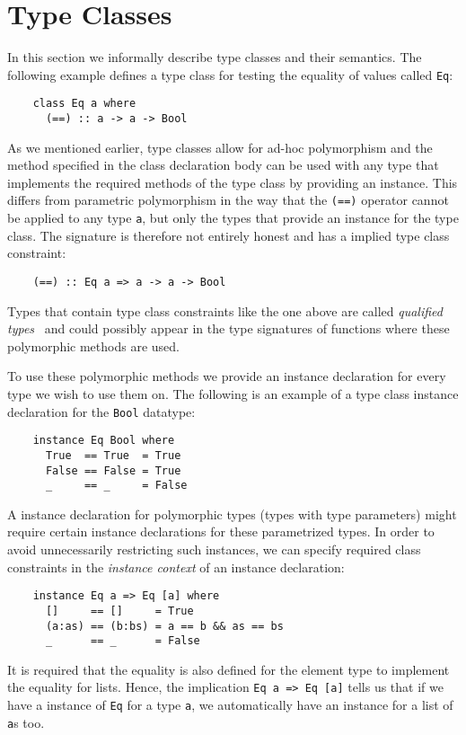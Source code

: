 \section{Type Classes}
In this section we informally describe type classes and their semantics. The
following example defines a type class for testing the equality of values
called \texttt{Eq}:
%
\begin{verbatim}
    class Eq a where
      (==) :: a -> a -> Bool
\end{verbatim}
%
As we mentioned earlier, type classes allow for ad-hoc polymorphism and the method
specified in the class declaration body can be used with any type that
implements the required methods of the type class by providing an instance.
This differs from parametric polymorphism in the way that the \texttt{(==)}
operator cannot be applied to any type \texttt{a}, but only the types that provide an
instance for the type class. The signature is therefore not entirely honest and
has a implied type class constraint:
\begin{verbatim}
    (==) :: Eq a => a -> a -> Bool
\end{verbatim}
Types that contain type class constraints like the one above are called
\textit{qualified types}~\cite{JonesThesis} and could possibly appear in the type signatures of
functions where these polymorphic methods are used.

To use these polymorphic methods we provide an instance declaration for every type
we wish to use them on. The following is an example of a type class instance
declaration for the \texttt{Bool} datatype:
\begin{verbatim}
    instance Eq Bool where
      True  == True  = True
      False == False = True
      _     == _     = False
\end{verbatim}
%
A instance declaration for polymorphic types (types with type parameters) might
require certain instance declarations for these parametrized types. In order to avoid unnecessarily restricting such instances,
we can specify required class constraints in the {\em instance context} of an instance declaration:
\begin{verbatim}
    instance Eq a => Eq [a] where
      []     == []     = True
      (a:as) == (b:bs) = a == b && as == bs
      _      == _      = False
\end{verbatim}
It is required that the equality is also defined for the element type to
implement the equality for lists. Hence, the implication \texttt{Eq a => Eq [a]}
tells us that if we have a instance of \texttt{Eq} for a type \texttt{a}, we
automatically have an instance for a list of \texttt{a}s too.

